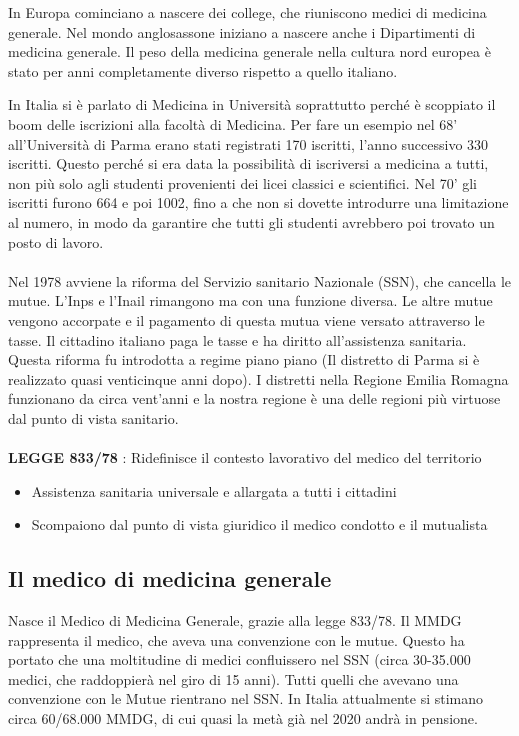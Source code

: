 In Europa cominciano a nascere dei college, che riuniscono medici di
medicina generale. Nel mondo anglosassone iniziano a nascere anche i
Dipartimenti di medicina generale. Il peso della medicina generale nella
cultura nord europea è stato per anni completamente diverso rispetto a
quello italiano.

In Italia si è parlato di Medicina in Università soprattutto perché è
scoppiato il boom delle iscrizioni alla facoltà di Medicina. Per fare un
esempio nel 68' all'Università di Parma erano stati registrati 170
iscritti, l'anno successivo 330 iscritti. Questo perché si era data la
possibilità di iscriversi a medicina a tutti, non più solo agli studenti
provenienti dei licei classici e scientifici. Nel 70' gli iscritti
furono 664 e poi 1002, fino a che non si dovette introdurre una
limitazione al numero, in modo da garantire che tutti gli studenti
avrebbero poi trovato un posto di lavoro.
\\\\
Nel 1978 avviene la riforma del Servizio sanitario Nazionale (SSN), che
cancella le mutue. L'Inps e l'Inail rimangono ma con una funzione
diversa. Le altre mutue vengono accorpate e il pagamento di questa mutua
viene versato attraverso le tasse. Il cittadino italiano paga le tasse e
ha diritto all'assistenza sanitaria. Questa riforma fu introdotta a
regime piano piano (Il distretto di Parma si è realizzato quasi
venticinque anni dopo). I distretti nella Regione Emilia Romagna
funzionano da circa vent'anni e la nostra regione è una delle regioni
più virtuose dal punto di vista sanitario.
\\\\
\textbf{LEGGE 833/78} : Ridefinisce il contesto lavorativo del medico del
territorio
\begin{itemize}
\item Assistenza sanitaria universale e allargata a tutti i cittadini
\item Scompaiono dal punto di vista giuridico il medico condotto e il
mutualista
\end{itemize}

\subsection{Il medico di medicina generale}

Nasce il Medico di Medicina Generale, grazie alla legge 833/78. Il MMDG
rappresenta il medico, che aveva una convenzione con le mutue. Questo ha
portato che una moltitudine di medici confluissero nel SSN (circa
30-35.000 medici, che raddoppierà nel giro di 15 anni). Tutti quelli che
avevano una convenzione con le Mutue rientrano nel SSN. In Italia
attualmente si stimano circa 60/68.000 MMDG, di cui quasi la metà già
nel 2020 andrà in pensione.

